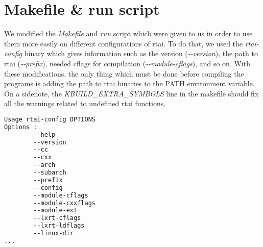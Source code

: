 \section{Makefile \& run script}

We modified the \emph{Makefile} and \emph{run} script which were given to us in order to use them more easily on different configurations of rtai. To do that, we used the \emph{rtai-config} binary which gives information such as the version (\emph{-{}-version}), the path to rtai (\emph{-{}-prefix}), needed cflags for compilation (\emph{-{}-module-cflags}), and so on. With these modifications, the only thing which must be done before compiling the programs is adding the path to rtai binaries to the PATH environment variable. On a sidenote, the \emph{KBUILD\_EXTRA\_SYMBOLS} line in the makefile should fix all the warnings related to undefined rtai functions.

\begin{lstlisting}[language=sh,caption={rtai-config help}]
Usage rtai-config OPTIONS
Options :
        --help
        --version
        --cc
        --cxx
        --arch
        --subarch
        --prefix
        --config
        --module-cflags
        --module-cxxflags
        --module-ext
        --lxrt-cflags
        --lxrt-ldflags
        --linux-dir
...
\end{lstlisting}



